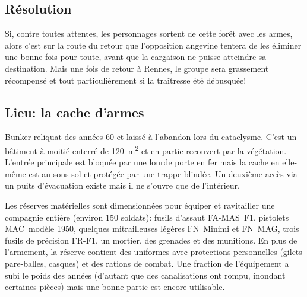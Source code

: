 \subsection{Résolution}

Si, contre toutes attentes, les personnages sortent de cette forêt avec les armes, alors c'est sur la route du retour que l'opposition angevine tentera de les éliminer une bonne fois pour toute, avant que la cargaison ne puisse atteindre sa destination.
Mais une fois de retour à Rennes, le groupe sera grassement récompensé et tout particulièrement si la traîtresse été débusquée!

\vfill
{}
\vfill

\subsection{Lieu: la cache d'armes}

\begin{tcolorbox}[colback=black!1!white]
Bunker reliquat des années 60 et laissé à l'abandon lors du cataclysme. C'est un bâtiment à moitié enterré de \SI{120}{\meter\squared} et en partie recouvert par la végétation. L'entrée principale est bloquée par une lourde porte en fer mais la cache en elle-même est au sous-sol et protégée par une trappe blindée.
Un deuxième accès via un puits d'évacuation existe mais il ne s'ouvre que de l'intérieur.

\medskip

Les réserves matérielles sont dimensionnées pour équiper et ravitailler une compagnie entière (environ 150 soldats): fusils d'assaut FA-MAS F1, pistolets MAC modèle 1950, quelques mitrailleuses légères FN Minimi et FN MAG, trois fusils de précision FR-F1, un mortier, des grenades et des munitions.
En plus de l'armement, la réserve contient des uniformes avec protections personnelles (gilets pare-balles, casques) et des rations de combat.
Une fraction de l'équipement a subi le poids des années (d'autant que des canalisations ont rompu, inondant certaines pièces) mais une bonne partie est encore utilisable.
\end{tcolorbox}

